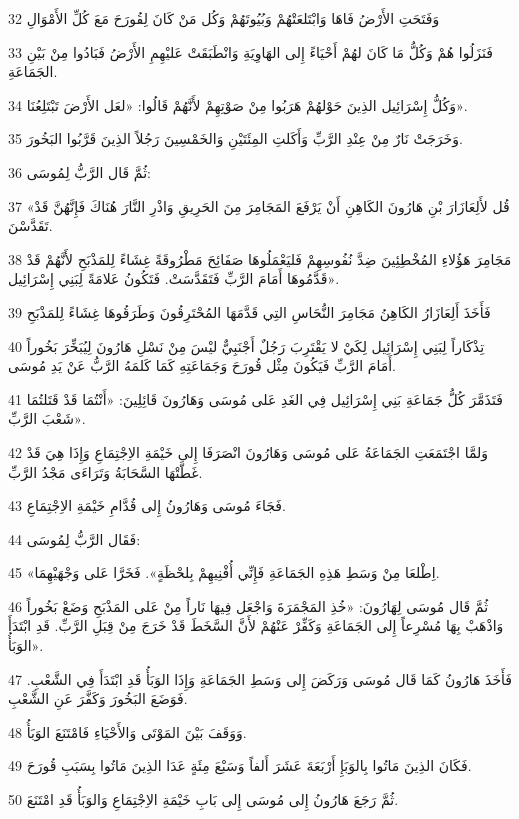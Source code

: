 \par 32 وَفَتَحَتِ الأَرْضُ فَاهَا وَابْتَلعَتْهُمْ وَبُيُوتَهُمْ وَكُل مَنْ كَانَ لِقُورَحَ مَعَ كُلِّ الأَمْوَالِ
\par 33 فَنَزَلُوا هُمْ وَكُلُّ مَا كَانَ لهُمْ أَحْيَاءً إِلى الهَاوِيَةِ وَانْطَبَقَتْ عَليْهِمِ الأَرْضُ فَبَادُوا مِنْ بَيْنِ الجَمَاعَةِ.
\par 34 وَكُلُّ إِسْرَائِيل الذِينَ حَوْلهُمْ هَرَبُوا مِنْ صَوْتِهِمْ لأَنَّهُمْ قَالُوا: «لعَل الأَرْضَ تَبْتَلِعُنَا».
\par 35 وَخَرَجَتْ نَارٌ مِنْ عِنْدِ الرَّبِّ وَأَكَلتِ المِئَتَيْنِ وَالخَمْسِينَ رَجُلاً الذِينَ قَرَّبُوا البَخُورَ.
\par 36 ثُمَّ قَال الرَّبُّ لِمُوسَى:
\par 37 «قُل لأَلِعَازَارَ بْنِ هَارُونَ الكَاهِنِ أَنْ يَرْفَعَ المَجَامِرَ مِنَ الحَرِيقِ وَاذْرِ النَّارَ هُنَاكَ فَإِنَّهُنَّ قَدْ تَقَدَّسْنَ.
\par 38 مَجَامِرَ هَؤُلاءِ المُخْطِئِينَ ضِدَّ نُفُوسِهِمْ فَليَعْمَلُوهَا صَفَائِحَ مَطْرُوقَةً غِشَاءً لِلمَذْبَحِ لأَنَّهُمْ قَدْ قَدَّمُوهَا أَمَامَ الرَّبِّ فَتَقَدَّسَتْ. فَتَكُونُ عَلامَةً لِبَنِي إِسْرَائِيل».
\par 39 فَأَخَذَ أَلِعَازَارُ الكَاهِنُ مَجَامِرَ النُّحَاسِ التِي قَدَّمَهَا المُحْتَرِقُونَ وَطَرَقُوهَا غِشَاءً لِلمَذْبَحِ
\par 40 تِذْكَاراً لِبَنِي إِسْرَائِيل لِكَيْ لا يَقْتَرِبَ رَجُلٌ أَجْنَبِيٌّ ليْسَ مِنْ نَسْلِ هَارُونَ لِيُبَخِّرَ بَخُوراً أَمَامَ الرَّبِّ فَيَكُونَ مِثْل قُورَحَ وَجَمَاعَتِهِ كَمَا كَلمَهُ الرَّبُّ عَنْ يَدِ مُوسَى.
\par 41 فَتَذَمَّرَ كُلُّ جَمَاعَةِ بَنِي إِسْرَائِيل فِي الغَدِ عَلى مُوسَى وَهَارُونَ قَائِلِينَ: «أَنْتُمَا قَدْ قَتَلتُمَا شَعْبَ الرَّبِّ».
\par 42 وَلمَّا اجْتَمَعَتِ الجَمَاعَةُ عَلى مُوسَى وَهَارُونَ انْصَرَفَا إِلى خَيْمَةِ الاِجْتِمَاعِ وَإِذَا هِيَ قَدْ غَطَّتْهَا السَّحَابَةُ وَتَرَاءَى مَجْدُ الرَّبِّ.
\par 43 فَجَاءَ مُوسَى وَهَارُونُ إِلى قُدَّامِ خَيْمَةِ الاِجْتِمَاعِ.
\par 44 فَقَال الرَّبُّ لِمُوسَى:
\par 45 «اِطْلعَا مِنْ وَسَطِ هَذِهِ الجَمَاعَةِ فَإِنِّي أُفْنِيهِمْ بِلحْظَةٍ». فَخَرَّا عَلى وَجْهَيْهِمَا.
\par 46 ثُمَّ قَال مُوسَى لِهَارُونَ: «خُذِ المَجْمَرَةَ وَاجْعَل فِيهَا نَاراً مِنْ عَلى المَذْبَحِ وَضَعْ بَخُوراً وَاذْهَبْ بِهَا مُسْرِعاً إِلى الجَمَاعَةِ وَكَفِّرْ عَنْهُمْ لأَنَّ السَّخَطَ قَدْ خَرَجَ مِنْ قِبَلِ الرَّبِّ. قَدِ ابْتَدَأَ الوَبَأُ».
\par 47 فَأَخَذَ هَارُونُ كَمَا قَال مُوسَى وَرَكَضَ إِلى وَسَطِ الجَمَاعَةِ وَإِذَا الوَبَأُ قَدِ ابْتَدَأَ فِي الشَّعْبِ. فَوَضَعَ البَخُورَ وَكَفَّرَ عَنِ الشَّعْبِ.
\par 48 وَوَقَفَ بَيْنَ المَوْتَى وَالأَحْيَاءِ فَامْتَنَعَ الوَبَأُ.
\par 49 فَكَانَ الذِينَ مَاتُوا بِالوَبَإِ أَرْبَعَةَ عَشَرَ أَلفاً وَسَبْعَ مِئَةٍ عَدَا الذِينَ مَاتُوا بِسَبَبِ قُورَحَ.
\par 50 ثُمَّ رَجَعَ هَارُونُ إِلى مُوسَى إِلى بَابِ خَيْمَةِ الاِجْتِمَاعِ وَالوَبَأُ قَدِ امْتَنَعَ.

